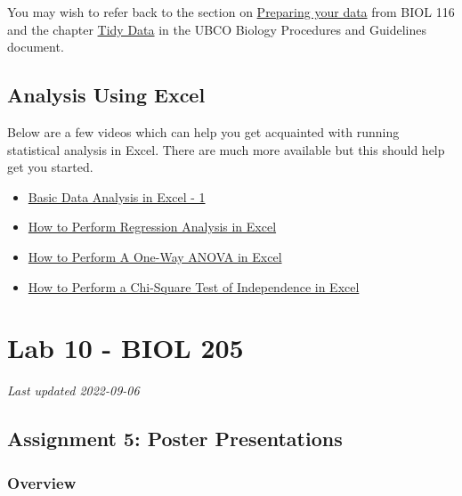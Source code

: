 \documentclass[
]{book}
\providecommand{\tightlist}{%
  \setlength{\itemsep}{0pt}\setlength{\parskip}{0pt}}
\begin{document}
You may wish to refer back to the section on \href{https://ubco-biology.github.io/BIOL-116-Lab-Manual/preparing-your-data.html}{Preparing your data} from BIOL 116 and the chapter \href{https://ubco-biology.github.io/Procedures-and-Guidelines/tidy-data.html}{Tidy Data} in the UBCO Biology Procedures and Guidelines document.

\hypertarget{analysis-using-excel}{%
\chapter*{Analysis Using Excel}\label{analysis-using-excel}}

Below are a few videos which can help you get acquainted with running statistical analysis in Excel. There are much more available but this should help get you started.

\begin{itemize}
\tightlist
\item
  \href{https://www.youtube.com/watch?v=2xxMJEj4Oyg}{Basic Data Analysis in Excel - 1}
\item
  \href{https://www.youtube.com/watch?v=0wr9ojMxkuQ}{How to Perform Regression Analysis in Excel}
\item
  \href{https://www.youtube.com/watch?v=ZvfO7-J5u34}{How to Perform A One-Way ANOVA in Excel}
\item
  \href{https://www.youtube.com/watch?v=NDhmMH25AC4}{How to Perform a Chi-Square Test of Independence in Excel}
\end{itemize}

\hypertarget{part-lab-10---biol-205}{%
\part*{Lab 10 - BIOL 205}\label{part-lab-10---biol-205}}

\emph{Last updated 2022-09-06}

\hypertarget{assignment-5-poster-presentations}{%
\chapter*{Assignment 5: Poster Presentations}\label{assignment-5-poster-presentations}}

\hypertarget{overview-3}{%
\section*{Overview}\label{overview-3}}
\end{document}
